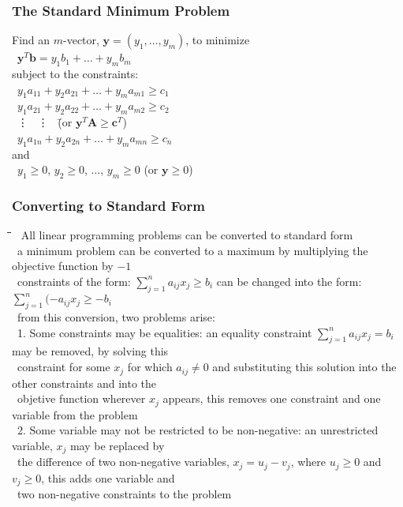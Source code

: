 \documentclass[10pt,letterpaper]{scrartcl}
\newcommand{\tbul}{\textbullet}
\newcommand{\tend}{\>\textendash}
\newcommand{\tabDef}{\hspace{2em}\=\hspace{2em}\=\hspace{2em}\=\hspace{2em}\=\kill}
\begin{document}
\subsubsection*{The Standard Minimum Problem}\begin{tabbing}
Find an $m$-vector, $\mathbf{y}=(y_1,\ldots , y_m)$, to minimize \= \\
\>\ $\mathbf{y}^T\mathbf{b}=y_1b_1 + \ldots + y_mb_m$ \\
subject to the constraints: \\
\>\ $y_1a_{11} + y_2a_{21} + \ldots + y_ma_{m1} \geq c_1$ \\
\>\ $y_1a_{21} + y_2a_{22} + \ldots + y_ma_{m2} \geq c_2$ \\
\>\ \vdots\ \hspace{12em} \vdots\ \hspace{2em} \=(or $\mathbf{y}^T\mathbf{A}\geq \mathbf{c}^T$)\\
\>\ $y_1a_{1n} + y_2a_{2n} + \ldots + y_ma_{mn} \geq c_n$ \\
and \\
\>\ $y_1 \geq 0$, $y_2 \geq 0$, $\ldots$, $y_m\geq 0$ \> (or $\mathbf{y} \geq 0$)\end{tabbing}
\subsubsection*{Converting to Standard Form}\begin{tabbing}\tabDef
\tbul\ All linear programming problems can be converted to standard form \\
\tbul\ a minimum problem can be converted to a maximum by multiplying the objective function by $-1$\\
    \tend\ constraints of the form: $\displaystyle\sum_{j=1}^{n}a_{ij}x_j\geq b_i$ can be changed into the form: $\displaystyle\sum_{j=1}^{n}(-a_{ij}x_j\geq -b_i$ \\
    \tend\ from this conversion, two problems arise: \\
    \>\>\ 1. Some constraints may be equalities: an equality constraint $\displaystyle\sum_{j=1}^{n}a_{ij}x_j=b_i$ may be removed, by solving this \\ \>\>\ constraint for some $x_j$ for which $a_{ij}\neq 0$ and substituting this solution into the other constraints and into the \\ \>\>\ objetive function wherever $x_j$ appears, this removes one constraint and one variable from the problem \\
    \>\>\ 2. Some variable may not be restricted to be non-negative: an unrestricted variable, $x_j$ may be replaced by \\ \>\>\ the difference of two non-negative variables, $x_j=u_j-v_j$, where $u_j\geq 0$ and $v_j\geq 0$, this adds one variable and \\ \>\>\ two non-negative constraints to the problem \end{tabbing}
\end{document}
